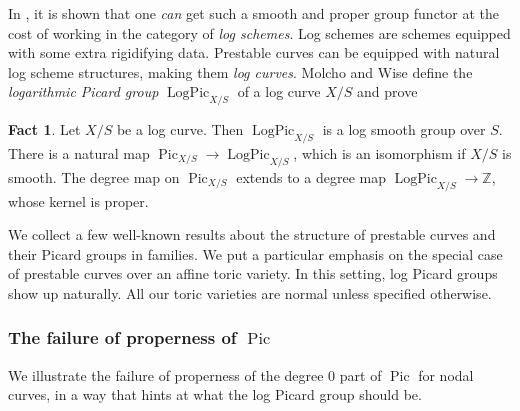 \documentclass[a4paper,11pt]{amsart} %
\numberwithin{equation}{subsection}
\newcommand{\on}[1]{\operatorname{#1}}
\newcommand{\bb}[1]{{\mathbb{#1}}}
\theoremstyle{definition}
\newtheorem{fact}[definition]{Fact}
\theoremstyle{plain}%
\theoremstyle{remark}
\begin{document}
In \cite{molcho_wise_2022}, it is shown that one \emph{can} get such a smooth and proper group functor at the cost of working in the category of \emph{log schemes}. Log schemes are schemes equipped with some extra rigidifying data. Prestable curves can be equipped with natural log scheme structures, making them \emph{log curves}. Molcho and Wise define the \emph{logarithmic Picard group} $\on{LogPic}_{X/S}$ of a log curve $X/S$ and prove

\begin{fact}
    Let $X/S$ be a log curve. Then $\on{LogPic}_{X/S}$ is a log smooth group over $S$. There is a natural map $\on{Pic}_{X/S} \to \on{LogPic}_{X/S}$, which is an isomorphism if $X/S$ is smooth. The degree map on $\on{Pic}_{X/S}$ extends to a degree map $\on{LogPic}_{X/S} \to \bb Z$, whose kernel is proper.
\end{fact}



We collect a few well-known results about the structure of prestable curves and their Picard groups in families. We put a particular emphasis on the special case of prestable curves over an affine toric variety. In this setting, log Picard groups show up naturally. All our toric varieties are normal unless specified otherwise.

\subsubsection{The failure of properness of $\on{Pic}$}

We illustrate the failure of properness of the degree $0$ part of $\on{Pic}$ for nodal curves, in a way that hints at what the log Picard group should be.
\end{document}
